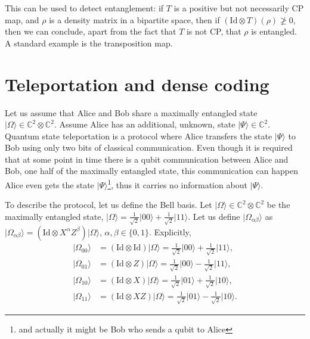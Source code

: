 \documentclass{article}
\theoremstyle{definition}
\newcommand{\id}{\mathrm{Id}}
\newcommand{\ket}[1]{\vert #1 \rangle}
\begin{document}
This can be used to detect entanglement: if $T$ is a positive but not necessarily CP map, and $\rho$ is a density matrix in a bipartite space, then if $(\id\otimes T)(\rho)\ngeq 0$, then we can conclude, apart from the fact that $T$ is not CP, that $\rho$ is entangled. A standard example is the transposition map.

\section{Teleportation and dense coding}

Let us assume that Alice and Bob share a maximally entangled state $\ket{\Omega}\in \mathbb{C}^2 \otimes \mathbb{C}^2$. Assume Alice has an additional, unknown, state $\ket{\Psi}\in\mathbb{C}^2$. Quantum state teleportation is a protocol where Alice transfers the state $\ket{\Psi}$ to Bob using only two bits of classical communication. Even though it is required that at some point in time there is a qubit communication between Alice and Bob, one half of the maximally entangled state, this communication can happen Alice even gets the state $\ket{\Psi}$\footnote{and actually it might be Bob who sends a qubit to Alice}, thus it carries no information about $\ket{\Psi}$. 

To describe the protocol, let us define the Bell basis. Let $\ket{\Omega}\in \mathbb{C}^2 \otimes \mathbb{C}^2$ be the maximally entangled state, $\ket{\Omega} = \frac{1}{\sqrt{2}} \ket{00} + \frac{1}{\sqrt{2}} \ket{11}$. Let us define $\ket{\Omega_{\alpha \beta}}$ as $\ket{\Omega_{\alpha\beta}} = (\id \otimes X^\alpha Z^\beta)\ket{\Omega}$, $\alpha,\beta\in \{0,1\}$. Explicitly,
\begin{align*}
  \ket{\Omega_{00}} &= (\id\otimes \id) \ket{\Omega} = \frac{1}{\sqrt{2}} \ket{00} + \frac{1}{\sqrt{2}} \ket{11},\\
  \ket{\Omega_{01}} &= (\id\otimes Z)\ket{\Omega} = \frac{1}{\sqrt{2}} \ket{00} - \frac{1}{\sqrt{2}} \ket{11},\\
  \ket{\Omega_{10}} &= (\id\otimes X)\ket{\Omega} = \frac{1}{\sqrt{2}} \ket{01} + \frac{1}{\sqrt{2}} \ket{10},\\
  \ket{\Omega_{11}} &= (\id\otimes XZ)\ket{\Omega} = \frac{1}{\sqrt{2}} \ket{01} - \frac{1}{\sqrt{2}} \ket{10}.  
\end{align*} 
\end{document}
